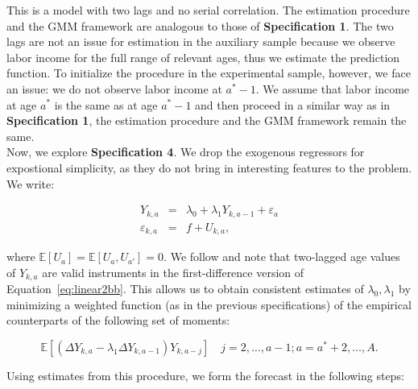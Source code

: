 \noindent This is a model with two lags and no serial correlation. The estimation procedure and the GMM framework are analogous to those of \textbf{Specification 1}. The two lags are not an issue for estimation in the auxiliary sample because we observe labor income for the full range of relevant ages, thus we estimate the prediction function. To initialize the procedure in the experimental sample, however, we face an issue: we do not observe labor income at $a^* - 1$. We assume that labor income at age $a^*$ is the same as at age $a^* - 1$ and then proceed in a similar way as in \textbf{Specification 1}, the estimation procedure and the GMM framework remain the same.\\

\noindent Now, we explore \textbf{Specification 4}. We drop the exogenous regressors for expostional simplicity, as they do not bring in interesting features to the problem. We write:

\begin{eqnarray}
Y_{k,a} &=& \lambda_{0} + \lambda_{1} Y_{k,a-1} + \varepsilon_{a} \label{eq:linear1bb} \\
\varepsilon_{k,a} &=& f + U_{k,a}, \label{eq:linear2bb}
\end{eqnarray}

\noindent where $\mathbb{E}[U_{a}] = \mathbb{E}[U_{a}, U_{a'}] = 0$. We follow \citet{Arellano_1991_Some-Tests} and note that two-lagged age values of $Y_{k,a}$ are valid instruments in the first-difference version of Equation~\eqref{eq:linear2bb}. This allows us to obtain consistent estimates of $\lambda_{0}, \lambda_{1}$ by minimizing a weighted function (as in the previous specifications) of the empirical counterparts of the following set of moments:

\begin{equation}
\mathbb{E} \left[ \left( \Delta Y_{k,a} -  \lambda_{1} \Delta Y_{k,a-1} \right)   Y_{k,a - j} \right] \quad j = 2, \ldots, a - 1; a = a^*+ 2, \ldots, A. \label{eq:abmoment}
\end{equation}

\noindent Using estimates from this procedure, we form the forecast in the following steps:

